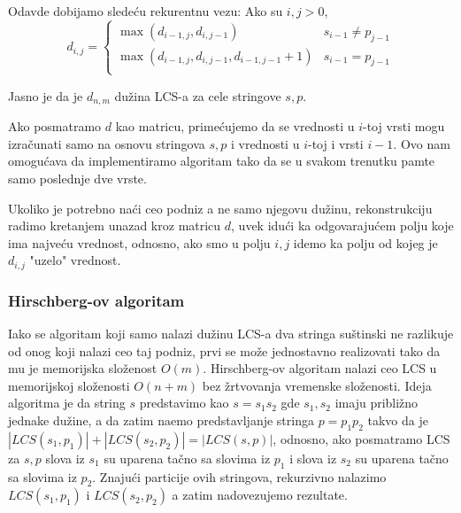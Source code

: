 Odavde dobijamo slede\' cu rekurentnu vezu: Ako su $i,j > 0$,
\begin{equation}
    d_{i,j} = \begin{cases}
        \max(d_{i-1,j}, d_{i,j-1}) & s_{i-1} \not = p_{j-1} \\
        \max(d_{i-1,j}, d_{i,j-1}, d_{i-1,j-1} + 1) &  s_{i-1} = p_{j-1} \\
    \end{cases}
\end{equation}

Jasno je da je $d_{n,m}$ du\v zina LCS-a za cele stringove $s,p$.



Ako posmatramo $d$ kao matricu, prime\' cujemo da se vrednosti u $i$-toj vrsti mogu izra\v cunati samo na osnovu stringova $s,p$ i vrednosti u $i$-toj i vrsti $i-1$. Ovo nam omogu\' cava da implementiramo algoritam tako da se u svakom trenutku pamte samo poslednje dve vrste.

\noindent
\begin{minipage}[l]{\textwidth}

\end{minipage}

Ukoliko je potrebno na\' ci ceo podniz a ne samo njegovu du\v zinu, rekonstrukciju radimo kretanjem unazad kroz matricu $d$, uvek idu\' ci ka odgovaraju\' cem polju koje ima najve\' cu vrednost, odnosno, ako smo u polju $i,j$ idemo ka polju od kojeg je $d_{i,j}$ "uzelo" vrednost.

\noindent
\begin{minipage}[l]{\textwidth}

\end{minipage}

\subsubsection{Hirschberg-ov algoritam}

Iako se algoritam koji samo nalazi du\v zinu LCS-a dva stringa su\v stinski ne razlikuje od onog koji nalazi ceo taj podniz, prvi se mo\v ze jednostavno realizovati tako da mu je memorijska slo\v zenost $O(m)$. Hirschberg-ov algoritam nalazi ceo LCS u memorijskoj slo\v zenosti $O(n+m)$ bez \v zrtvovanja vremenske slo\v zenosti.\cite{hirschbergrad} Ideja algoritma je da string $s$ predstavimo kao $s=s_1s_2$ gde $s_1,s_2$ imaju pribli\v zno jednake du\v zine, a da zatim na\dj emo predstavljanje stringa $p=p_1p_2$ takvo da je $|LCS(s_1, p_1)| + |LCS(s_2, p_2)| = |LCS(s, p)|$, odnosno, ako posmatramo LCS za $s,p$ slova iz $s_1$ su uparena ta\v cno sa slovima iz $p_1$ i slova iz $s_2$ su uparena ta\v cno sa slovima iz $p_2$. Znaju\' ci particije ovih stringova, rekurzivno nalazimo $LCS(s_1, p_1)$ i $LCS(s_2, p_2)$ a zatim nadovezujemo rezultate.

